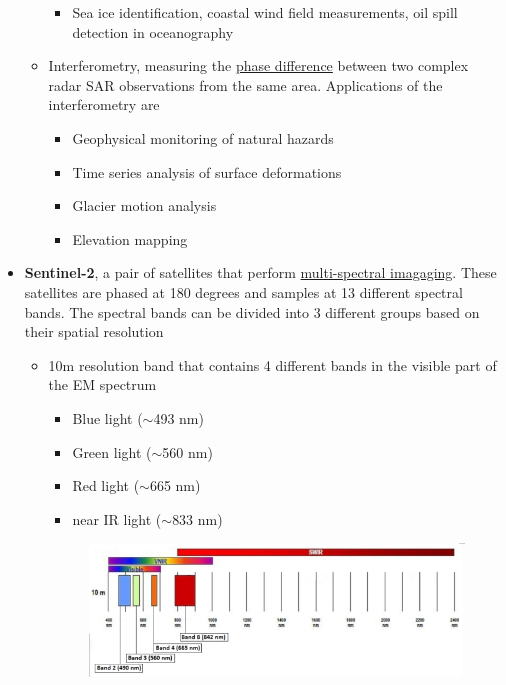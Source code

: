 \begin{itemize}
\begin{itemize}
\begin{itemize}
            \item Sea ice identification, coastal wind field measurements, oil spill detection in oceanography
        \end{itemize}
        \item Interferometry, measuring the \underline{phase difference} between two complex radar SAR observations from the same area. Applications of the interferometry are 
        \begin{itemize}
            \item Geophysical monitoring of natural hazards
            \item Time series analysis of surface deformations
            \item Glacier motion analysis
            \item Elevation mapping
        \end{itemize}
    \end{itemize}
    \item \textbf{Sentinel-2}, a pair of satellites that perform \underline{multi-spectral imagaging}. These satellites are phased at 180 degrees and samples at 13 different spectral bands. The spectral bands can be divided into 3 different groups based on their spatial resolution
    \begin{itemize}
        \item 10m resolution band that contains 4 different bands in the visible part of the EM spectrum
        \begin{itemize}
            \item Blue light ($\sim$493 nm)
            \item Green light ($\sim$560 nm)
            \item Red light ($\sim$665 nm)
            \item near IR light ($\sim$833 nm)
        \end{itemize}
        \begin{figure}[h!]
            \centering
            \includegraphics[width=\textwidth]{data_sources/img/sentinel2-bands1.png}

\end{figure}
\end{itemize}
\end{itemize}
